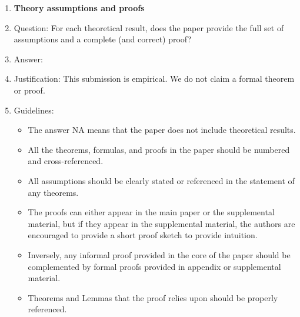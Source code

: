 \documentclass{article}
\begin{document}
\begin{enumerate}
\item {\bf Theory assumptions and proofs}
    \item[] Question: For each theoretical result, does the paper provide the full set of assumptions and a complete (and correct) proof?
    \item[] Answer: \answerNA{}
    \item[] Justification: This submission is empirical. We do not claim a formal theorem or proof.
    \item[] Guidelines:
    \begin{itemize}
        \item The answer NA means that the paper does not include theoretical results. 
        \item All the theorems, formulas, and proofs in the paper should be numbered and cross-referenced.
        \item All assumptions should be clearly stated or referenced in the statement of any theorems.
        \item The proofs can either appear in the main paper or the supplemental material, but if they appear in the supplemental material, the authors are encouraged to provide a short proof sketch to provide intuition. 
        \item Inversely, any informal proof provided in the core of the paper should be complemented by formal proofs provided in appendix or supplemental material.
        \item Theorems and Lemmas that the proof relies upon should be properly referenced. 
    \end{itemize}


\end{enumerate}
\end{document}

